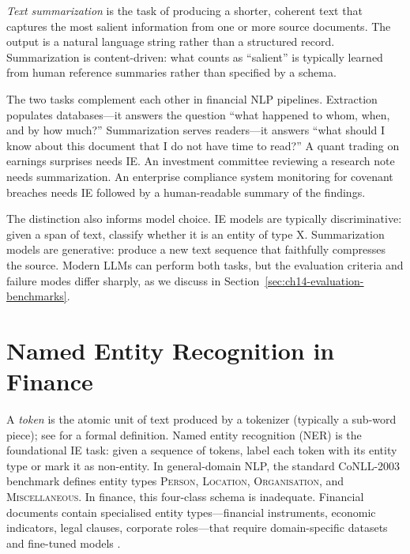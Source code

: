 \begin{definition}
\label{def:text-summarization}
\emph{Text summarization} is the task of producing a shorter, coherent text that captures
the most salient information from one or more source documents. The output is a natural
language string rather than a structured record. Summarization is content-driven: what
counts as ``salient'' is typically learned from human reference summaries rather than
specified by a schema.
\end{definition}

The two tasks complement each other in financial NLP pipelines. Extraction populates
databases---it answers the question ``what happened to whom, when, and by how much?''
Summarization serves readers---it answers ``what should I know about this document that
I do not have time to read?'' A quant trading on earnings surprises needs IE. An
investment committee reviewing a research note needs summarization. An enterprise
compliance system monitoring for covenant breaches needs IE followed by a human-readable
summary of the findings.

The distinction also informs model choice. IE models are typically discriminative:
given a span of text, classify whether it is an entity of type X. Summarization models
are generative: produce a new text sequence that faithfully compresses the source. Modern
LLMs can perform both tasks, but the evaluation criteria and failure modes differ sharply,
as we discuss in Section~\ref{sec:ch14-evaluation-benchmarks}.

\section{Named Entity Recognition in Finance}
\label{sec:ch14-named-entity-recognition}

A \emph{token} is the atomic unit of text produced by a tokenizer (typically a sub-word piece); see  for a formal definition.
Named entity recognition (NER) is the foundational IE task: given a sequence of tokens,
label each token with its entity type or mark it as non-entity. In general-domain NLP,
the standard CoNLL-2003 benchmark defines entity types \textsc{Person}, \textsc{Location},
\textsc{Organisation}, and \textsc{Miscellaneous}. In finance, this four-class schema is
inadequate. Financial documents contain specialised entity types---financial instruments,
economic indicators, legal clauses, corporate roles---that require domain-specific datasets
and fine-tuned models \cite{lample2016neural}.

